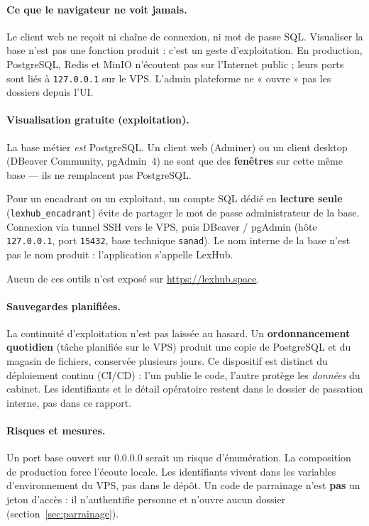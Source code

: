 \paragraph{Ce que le navigateur ne voit jamais.}
Le client web ne reçoit ni chaîne de connexion, ni mot de passe SQL. Visualiser la base n'est pas une fonction produit : c'est un geste d'exploitation. En production, PostgreSQL, Redis et MinIO n'écoutent pas sur l'Internet public ; leurs ports sont liés à \texttt{127.0.0.1} sur le VPS. L'admin plateforme ne « ouvre » pas les dossiers depuis l'UI.

\paragraph{Visualisation gratuite (exploitation).}
La base métier \emph{est} PostgreSQL. Un client web (Adminer) ou un client desktop (DBeaver Community, pgAdmin~4) ne sont que des \textbf{fenêtres} sur cette même base --- ils ne remplacent pas PostgreSQL.

Pour un encadrant ou un exploitant, un compte SQL dédié en \textbf{lecture seule} (\texttt{lexhub_encadrant}) évite de partager le mot de passe administrateur de la base. Connexion via tunnel SSH vers le VPS, puis DBeaver / pgAdmin (hôte \texttt{127.0.0.1}, port \texttt{15432}, base technique \texttt{sanad}). Le nom interne de la base n'est pas le nom produit : l'application s'appelle LexHub.

Aucun de ces outils n'est exposé sur \url{https://lexhub.space}.

\paragraph{Sauvegardes planifiées.}
La continuité d'exploitation n'est pas laissée au hasard. Un \textbf{ordonnancement quotidien} (tâche planifiée sur le VPS) produit une copie de PostgreSQL et du magasin de fichiers, conservée plusieurs jours. Ce dispositif est distinct du déploiement continu (CI/CD) : l'un publie le code, l'autre protège les \emph{données} du cabinet. Les identifiants et le détail opératoire restent dans le dossier de passation interne, pas dans ce rapport.

\paragraph{Risques et mesures.}
Un port base ouvert sur $0.0.0.0$ serait un risque d'énumération. La composition de production force l'écoute locale. Les identifiants vivent dans les variables d'environnement du VPS, pas dans le dépôt. Un code de parrainage n'est \textbf{pas} un jeton d'accès : il n'authentifie personne et n'ouvre aucun dossier (section~\ref{sec:parrainage}).

